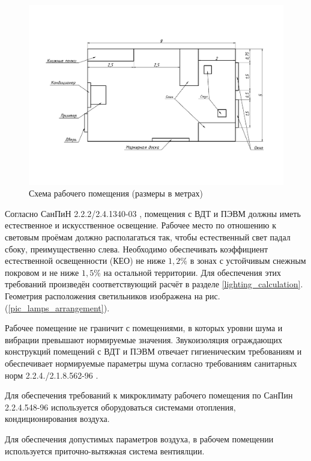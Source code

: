 \begin{figure}[ht!]
    \centering
    \includegraphics[width=\textwidth, keepaspectratio, clip=true, trim=0mm 35mm 0mm 35mm]
                    {./src/ecology/pictures/workroom_scheme}
    \caption{Схема рабочего помещения (размеры в метрах)}
    \label{pic_workroom_scheme}
\end{figure}

Согласно СанПиН 2.2.2/2.4.1340-03 \cite{ecology_sanpin_1340_03}, помещения с ВДТ
и ПЭВМ должны иметь естественное и искусственное освещение. Рабочее место по
отношению к световым проёмам должно располагаться так, чтобы естественный свет
падал сбоку, преимущественно слева. Необходимо обеспечивать коэффициент
естественной освещенности (КЕО) не ниже $1,2 \%$ в зонах с устойчивым снежным
покровом и не ниже $1,5 \%$ на остальной территории.
Для обеспечения этих требований произведён соответствующий расчёт в разделе
\ref{lighting_calculation}. Геометрия расположения светильников изображена на рис.
(\ref{pic_lamps_arrangement}).

Рабочее помещение не граничит с помещениями, в которых уровни шума и вибрации превышают
нормируемые значения. Звукоизоляция ограждающих конструкций помещений с ВДТ и ПЭВМ
отвечает гигиеническим требованиям и обеспечивает нормируемые параметры шума
согласно требованиям санитарных норм 2.2.4./2.1.8.562-96 \cite{ecology_sanitary_norm_562_96}.

Для обеспечения требований к микроклимату рабочего помещения по СанПин 2.2.4.548-96
\cite{ecology_sanpin_548_96} используется оборудоваться системами отопления,
кондиционирования воздуха.

Для обеспечения допустимых параметров воздуха, в рабочем помещении используется
приточно-вытяжная система вентиялции.

